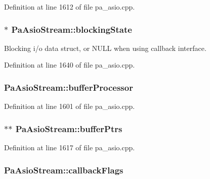 Definition at line 1612 of file pa\+\_\+asio.\+cpp.

\subsubsection[{\texorpdfstring{blocking\+State}{blockingState}}]{$\ast$ Pa\+Asio\+Stream\+::blocking\+State}\hypertarget{struct_pa_asio_stream_a9a43b2884ff0bd92b02e94863c359106}{}\label{struct_pa_asio_stream_a9a43b2884ff0bd92b02e94863c359106}
Blocking i/o data struct, or N\+U\+LL when using callback interface. 

Definition at line 1640 of file pa\+\_\+asio.\+cpp.

\subsubsection[{\texorpdfstring{buffer\+Processor}{bufferProcessor}}]{ Pa\+Asio\+Stream\+::buffer\+Processor}\hypertarget{struct_pa_asio_stream_ac48d721d10bcdf041cc097b08493d684}{}\label{struct_pa_asio_stream_ac48d721d10bcdf041cc097b08493d684}


Definition at line 1601 of file pa\+\_\+asio.\+cpp.

\subsubsection[{\texorpdfstring{buffer\+Ptrs}{bufferPtrs}}]{$\ast$$\ast$ Pa\+Asio\+Stream\+::buffer\+Ptrs}\hypertarget{struct_pa_asio_stream_ac907e7cf08200d9ebeed13c17cb5c6e2}{}\label{struct_pa_asio_stream_ac907e7cf08200d9ebeed13c17cb5c6e2}


Definition at line 1617 of file pa\+\_\+asio.\+cpp.

\subsubsection[{\texorpdfstring{callback\+Flags}{callbackFlags}}]{ Pa\+Asio\+Stream\+::callback\+Flags}\hypertarget{struct_pa_asio_stream_a3fca0112299e71c6007600a8a85ae421}{}\label{struct_pa_asio_stream_a3fca0112299e71c6007600a8a85ae421}


